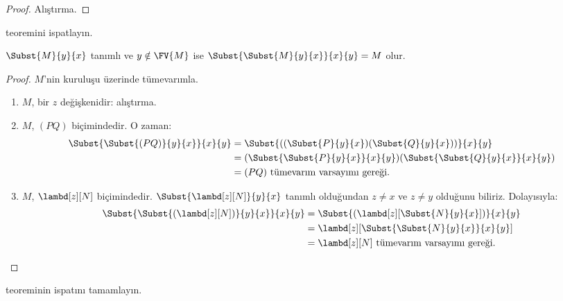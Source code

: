 \documentclass[../../../include/open-logic-section]{subfiles}
\begin{document}
\begin{proof}
  Alıştırma.
\end{proof}

\begin{prob}
   teoremini ispatlayın.
\end{prob}


\begin{thm}
  $\Subst{M}{y}{x}$ tanımlı ve $y \notin \FV{M}$ ise
  $\Subst{\Subst{M}{y}{x}}{x}{y} = M$ olur.
\end{thm}

\begin{proof}
  $M$'nin kuruluşu üzerinde tümevarımla.
  \begin{enumerate}
  \item $M$, bir $z$ değişkenidir: alıştırma.
  \item $M$, $(PQ)$ biçimindedir. O zaman:
    \begin{align*}
      \Subst{\Subst{(PQ)}{y}{x}}{x}{y}
      &=\Subst{((\Subst{P}{y}{x})(\Subst{Q}{y}{x}))}{x}{y} \\
      &= (\Subst{\Subst{P}{y}{x}}{x}{y})(\Subst{\Subst{Q}{y}{x}}{x}{y}) \\
      &= (PQ) \text{ tümevarım varsayımı gereği.}
    \end{align*}
  \item $M$, $\lambd[z][N]$ biçimindedir.
    $\Subst{\lambd[z][N]}{y}{x}$ tanımlı olduğundan $z\neq x$ ve
    $z\neq y$ olduğunu biliriz. Dolayısıyla:
    \begin{align*}
      \Subst{\Subst{(\lambd[z][N])}{y}{x}}{x}{y}
      & = \Subst{(\lambd[z][\Subst{N}{y}{x}])}{x}{y} \\
      & = \lambd[z][\Subst{\Subst{N}{y}{x}}{x}{y}] \\
      &= \lambd[z][N] \text{ tümevarım varsayımı gereği.}
    \end{align*}
  \end{enumerate}
\end{proof}

\begin{prob}
   teoreminin ispatını tamamlayın.
\end{prob}
\end{document}
